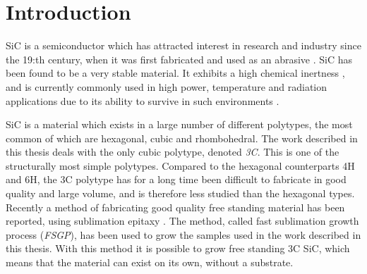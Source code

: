 
\chapter{Introduction}






SiC is a semiconductor which has attracted interest in research and industry since the 19:th century, when it was first fabricated and used as an abrasive \cite{Acheson1893}. SiC has been found to be a very stable material. It exhibits a high chemical inertness \cite{Hume1941}, and is currently commonly used in high power, temperature and radiation applications due to its ability to survive in such environments \cite{J.B.CASADYandR.W.JOHNSON1996}. 

SiC is a material which exists in a large number of different polytypes, the most common of which are hexagonal, cubic and rhombohedral. The work described in this thesis deals with the only cubic polytype, denoted \emph{3C}. This is one of the structurally most simple polytypes. Compared to the hexagonal counterparts 4H and 6H, the 3C polytype has for a long time been difficult to fabricate in good quality and large volume, and is therefore less studied than the hexagonal types. Recently a method of fabricating good quality free standing material has been reported, using sublimation epitaxy \cite{Jokubavicius2014}. The method, called fast sublimation growth process (\emph{FSGP}), has been used to grow the samples used in the work described in this thesis. With this method it is possible to grow free standing 3C SiC, which means that the material can exist on its own, without a substrate. %

